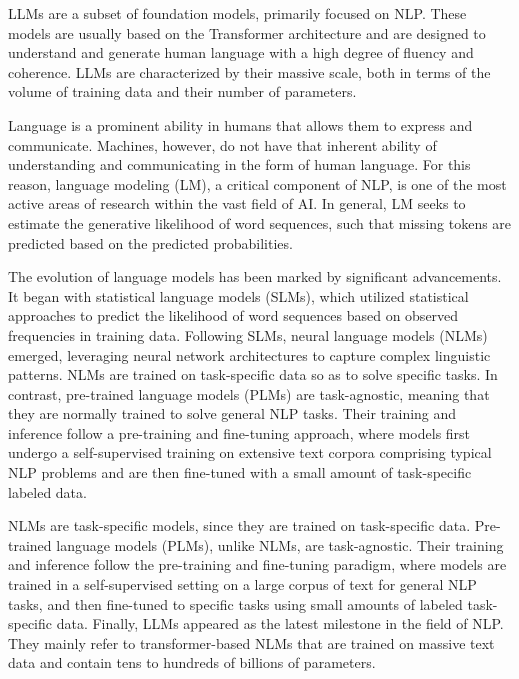\documentclass[11pt,english,listoffigures,listoftables]{tfgetsinf}
\begin{document}
LLMs are a subset of foundation models, primarily focused on NLP. These models are usually based on the Transformer architecture and are designed to understand and generate human language with a high degree of fluency and coherence. LLMs are characterized by their massive scale, both in terms of the volume of training data and their number of parameters.

Language is a prominent ability in humans that allows them to express and communicate. Machines, however, do not have that inherent ability of understanding and communicating in the form of human language. For this reason, language modeling (LM), a critical component of NLP, is one of the most active areas of research within the vast field of AI. In general, LM seeks to estimate the generative likelihood of word sequences, such that missing tokens are predicted based on the predicted probabilities.



The evolution of language models has been marked by significant advancements. It began with statistical language models (SLMs), which utilized statistical approaches to predict the likelihood of word sequences based on observed frequencies in training data. Following SLMs, neural language models (NLMs) emerged, leveraging neural network architectures to capture complex linguistic patterns. NLMs are trained on task-specific data so as to solve specific tasks. In contrast, pre-trained language models (PLMs) are task-agnostic, meaning that they are normally trained to solve general NLP tasks. Their training and inference follow a pre-training and fine-tuning approach, where models first undergo a self-supervised training on extensive text corpora comprising typical NLP problems and are then fine-tuned with a small amount of task-specific labeled data. 


NLMs are task-specific models, since they are trained on task-specific data. Pre-trained language models (PLMs), unlike NLMs, are task-agnostic. Their training and inference follow the pre-training and fine-tuning paradigm, where models are trained in a self-supervised setting on a large corpus of text for general NLP tasks, and then fine-tuned to specific tasks using small amounts of labeled task-specific data. Finally, LLMs appeared as the latest milestone in the field of NLP. They mainly refer to transformer-based NLMs that are trained on massive text data and contain tens to hundreds of billions of parameters. 
\end{document}
